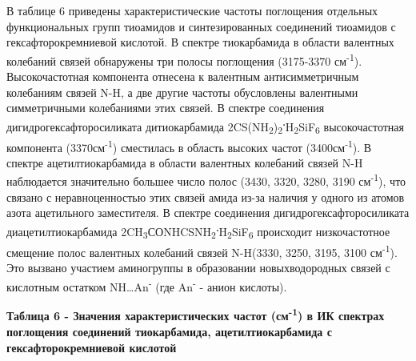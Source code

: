 В таблице 6 приведены характеристические частоты поглощения отдельных
функциональных групп тиоамидов и синтезированных соединений тиоамидов с
гексафторокремниевой кислотой. В спектре тиокарбамида в области
валентных колебаний связей обнаружены три полосы поглощения (3175-3370
см\textsuperscript{-1}). Высокочастотная компонента отнесена к валентным
антисимметричным колебаниям связей N-H, а две другие частоты обусловлены
валентными симметричными колебаниями этих связей. В спектре соединения
дигидрогексафторосиликата дитиокарбамида
2CS(NH\textsubscript{2})\textsubscript{2}{\bfseries \textsuperscript{.}}H\textsubscript{2}SiF\textsubscript{6}
высокочастотная компонента (3370см\textsuperscript{-1}) сместилась в
область высоких частот (3400см\textsuperscript{-1}). В спектре
ацетилтиокарбамида в области валентных колебаний связей N-H наблюдается
значительно большее число полос (3430, 3320, 3280, 3190
см\textsuperscript{-1}), что связано с неравноценностью этих связей
амида из-за наличия у одного из атомов азота ацетильного заместителя. В
спектре соединения дигидрогексафторосиликата диацетилтиокарбамида
2CH\textsubscript{3}СОNHCSNH\textsubscript{2}{\bfseries \textsuperscript{.}}H\textsubscript{2}SiF\textsubscript{6}
происходит низкочастотное смещение полос валентных колебаний связей
N-H(3330, 3250, 3195, 3100 см\textsuperscript{-1}). Это вызвано участием
аминогруппы в образовании новыхводородных связей с кислотным остатком
NH\ldots An\textsuperscript{-} (где An\textsuperscript{-} - анион
кислоты).

{\bfseries Таблица 6 - Значения характеристических частот
(см\textsuperscript{-1}) в ИК спектрах поглощения соединений
тиокарбамида, ацетилтиокарбамида с гексафторокремниевой кислотой}

